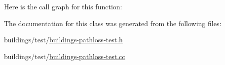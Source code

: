 Here is the call graph for this function\+:




The documentation for this class was generated from the following files\+:\begin{DoxyCompactItemize}
\item 
buildings/test/\hyperlink{buildings-pathloss-test_8h}{buildings-\/pathloss-\/test.\+h}\item 
buildings/test/\hyperlink{buildings-pathloss-test_8cc}{buildings-\/pathloss-\/test.\+cc}\end{DoxyCompactItemize}
